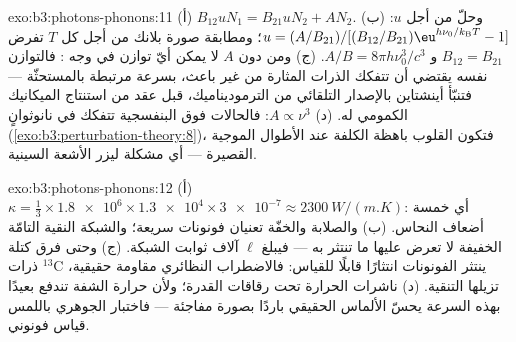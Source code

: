 \begin{solution}{exo:b3:photons-phonons:11}
(أ) $B_{12}uN_1 = B_{21}uN_2 + AN_2$. (ب) وحلّ من أجل $u$:
$u = (A/B_{21})/[(B_{12}/B_{21})\eu^{h\nu_0/k_{\text{B}}T} - 1]$؛
ومطابقة صورة بلانك من أجل كل $T$ تفرض $B_{12} = B_{21}$ و
$A/B = 8\pi h\nu_0^3/c^3$. (ج) ومن دون $A$ لا يمكن أيّ توازن
في وجه : فالتوازن نفسه يقتضي أن تتفكك الذرات
المثارة من غير باعث، بسرعة مرتبطة بالمستحثّة ---
فتنبّأ أينشتاين بالإصدار التلقائي من الترموديناميك، قبل
عقد من استنتاج الميكانيك الكمومي له. (د) $A \propto
\nu^3$: فالحالات فوق البنفسجية تتفكك في نانوثوانٍ
(\cref{exo:b3:perturbation-theory:8})، فتكون القلوب
باهظة الكلفة عند الأطوال الموجية القصيرة --- أي مشكلة ليزر
الأشعة السينية.
\end{solution}

\begin{solution}{exo:b3:photons-phonons:12}
(أ) $\kappa = \tfrac13 \times \num{1.8e6} \times \num{1.3e4}
\times \num{3e-7} \approx \qty{2300}{W/(m.K)}$: أي خمسة أضعاف
النحاس. (ب) والصلابة والخفّة تعنيان فونونات سريعة؛ والشبكة النقية التامّة
الخفيفة لا تعرض عليها ما تنتثر به --- فيبلغ $\ell$
آلاف ثوابت الشبكة. (ج) وحتى فرق كتلة ذرات
$^{13}$C ينتثر الفونونات انتثارًا قابلًا للقياس: فالاضطراب النظائري
مقاومة حقيقية، تزيلها التنقية. (د) ناشرات الحرارة
تحت رقاقات القدرة؛ ولأن حرارة الشفة تندفع بعيدًا بهذه السرعة يحسّ
الألماس الحقيقي باردًا بصورة مفاجئة --- فاختبار الجوهري باللمس
قياس فونوني.
\end{solution}

